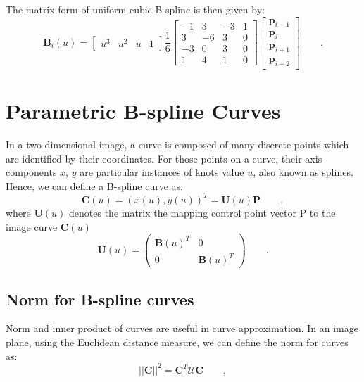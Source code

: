 The matrix-form of uniform cubic B-spline is then given by:
\begin{equation}
  \label{eq:4.8}
\mathbf{B}_i(u) = \begin{bmatrix} u^3 & u^2 & u & 1 \end{bmatrix} \frac{1}{6} \begin{bmatrix}
-1 &  3 & -3 & 1 \\
 3 & -6 &  3 & 0 \\
-3 &  0 &  3 & 0 \\
 1 &  4 &  1 & 0 \end{bmatrix}
\begin{bmatrix} \mathbf{p}_{i-1} \\ \mathbf{p}_{i} \\ \mathbf{p}_{i+1}
  \\ \mathbf{p}_{i+2} \end{bmatrix}\qquad .
\end{equation}

\section{Parametric B-spline Curves}
\label{sec:pbc}

In a two-dimensional image, a curve is composed of many discrete points which are
identified by their coordinates. For those points on a curve, their axis
components $x$, $y$ are particular instances of knots value $u$, also known
as splines. Hence, we can define a B-spline curve as:
\begin{equation}
  \label{eq:paramcurve}
  \mathbf{C}(u) = (x(u),y(u))^T = \mathbf{U}(u) \mathbf{P} \qquad ,
\end{equation}
where $\mathbf{U}(u)$ denotes the matrix the mapping control point
vector P to the image
curve $\mathbf{C}(u)$
\begin{equation}
  \label{eq:4.12}
  \mathbf{U}(u) =   \begin{pmatrix}
\mathbf{B}(u)^T & 0 \\
0 &\mathbf{B}(u)^T
  \end{pmatrix}\qquad .
\end{equation}

\subsection{Norm for B-spline curves}
\label{sec:nbc}

Norm and inner product of curves are useful in curve approximation. In
an image plane, using the Euclidean distance measure, we can define the
norm for curves as:
\begin{equation}
  \label{eq:4.13}
  \left| \left| \mathbf{C} \right|\right|^2  = \mathbf{C}^T\mathcal{U}\mathbf{C}\qquad ,
\end{equation}

